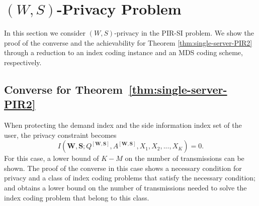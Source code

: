 \documentclass[letterpaper, 10 pt, conference]{ieeeconf}
\begin{document}



\section{$(W,S)$-Privacy Problem}
\label{sec:IEEEproof-theorem-2}

In this section we consider $(W,S)$-privacy in the PIR-SI problem. We show the proof of the converse and the achievability for Theorem \ref{thm:single-server-PIR2} through a reduction to an index coding instance and an MDS coding scheme, respectively.


\subsection{Converse for Theorem~\ref{thm:single-server-PIR2}}
\label{sec:converse-mds}
When protecting the demand index and the side information index set of the user, the privacy constraint becomes $$I(\mathbf{W},\mathbf{S};Q^{[\mathbf{W},\mathbf{S}]},A^{[\mathbf{W},\mathbf{S}]},X_1,X_2,...,X_K) = 0.$$ For this case, a lower bound of $K-M$ on the number of transmissions can be shown. The proof of the converse in this case shows a necessary condition for privacy and a class of index coding problems that satisfy the necessary condition; and obtains a lower bound on the number of transmissions needed to solve the index coding problem that {belong to this class}. 
\end{document}
